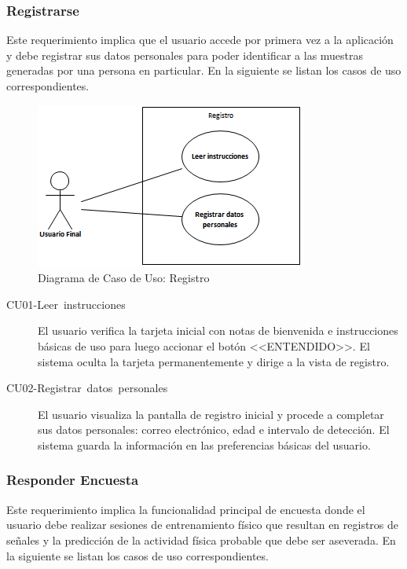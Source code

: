 \subsubsection{Registrarse}

Este requerimiento implica que el usuario accede por primera vez a
la aplicación y debe registrar sus datos personales para poder identificar
a las muestras generadas por una persona en particular. En la siguiente
 se listan los casos de uso correspondientes.

\begin{figure}[H]
\begin{centering}
\includegraphics{capitulo-5/graphics/caso_registro}
\par\end{centering}
\caption[Diagrama de Caso de Uso: Registro]{\label{fig5:uc-registro}Diagrama de Caso de Uso: Registro}
\end{figure}

\begin{description}
\item [{CU01-Leer~instrucciones}] El usuario verifica la tarjeta inicial
con notas de bienvenida e instrucciones básicas de uso para luego
accionar el botón <<ENTENDIDO>>. El sistema oculta la tarjeta permanentemente
y dirige a la vista de registro.
\item [{CU02-Registrar~datos~personales}] El usuario visualiza la pantalla
de registro inicial y procede a completar sus datos personales: correo
electrónico, edad e intervalo de detección. El sistema guarda la información
en las preferencias básicas del usuario.
\end{description}

\subsubsection{Responder Encuesta}

Este requerimiento implica la funcionalidad principal de encuesta
donde el usuario debe realizar sesiones de entrenamiento físico que
resultan en registros de señales y la predicción de la actividad física
probable que debe ser aseverada. En la siguiente 
se listan los casos de uso correspondientes.

